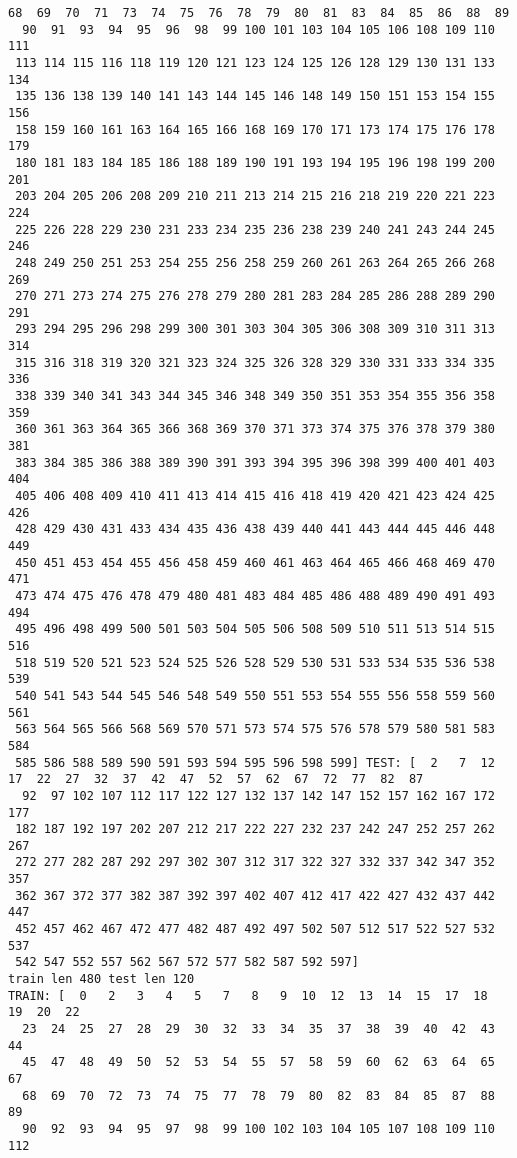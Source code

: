 \documentclass[11pt]{article}
\begin{document}
\begin{Verbatim}[commandchars=\\\{\}]
  68  69  70  71  73  74  75  76  78  79  80  81  83  84  85  86  88  89
  90  91  93  94  95  96  98  99 100 101 103 104 105 106 108 109 110 111
 113 114 115 116 118 119 120 121 123 124 125 126 128 129 130 131 133 134
 135 136 138 139 140 141 143 144 145 146 148 149 150 151 153 154 155 156
 158 159 160 161 163 164 165 166 168 169 170 171 173 174 175 176 178 179
 180 181 183 184 185 186 188 189 190 191 193 194 195 196 198 199 200 201
 203 204 205 206 208 209 210 211 213 214 215 216 218 219 220 221 223 224
 225 226 228 229 230 231 233 234 235 236 238 239 240 241 243 244 245 246
 248 249 250 251 253 254 255 256 258 259 260 261 263 264 265 266 268 269
 270 271 273 274 275 276 278 279 280 281 283 284 285 286 288 289 290 291
 293 294 295 296 298 299 300 301 303 304 305 306 308 309 310 311 313 314
 315 316 318 319 320 321 323 324 325 326 328 329 330 331 333 334 335 336
 338 339 340 341 343 344 345 346 348 349 350 351 353 354 355 356 358 359
 360 361 363 364 365 366 368 369 370 371 373 374 375 376 378 379 380 381
 383 384 385 386 388 389 390 391 393 394 395 396 398 399 400 401 403 404
 405 406 408 409 410 411 413 414 415 416 418 419 420 421 423 424 425 426
 428 429 430 431 433 434 435 436 438 439 440 441 443 444 445 446 448 449
 450 451 453 454 455 456 458 459 460 461 463 464 465 466 468 469 470 471
 473 474 475 476 478 479 480 481 483 484 485 486 488 489 490 491 493 494
 495 496 498 499 500 501 503 504 505 506 508 509 510 511 513 514 515 516
 518 519 520 521 523 524 525 526 528 529 530 531 533 534 535 536 538 539
 540 541 543 544 545 546 548 549 550 551 553 554 555 556 558 559 560 561
 563 564 565 566 568 569 570 571 573 574 575 576 578 579 580 581 583 584
 585 586 588 589 590 591 593 594 595 596 598 599] TEST: [  2   7  12  17  22  27  32  37  42  47  52  57  62  67  72  77  82  87
  92  97 102 107 112 117 122 127 132 137 142 147 152 157 162 167 172 177
 182 187 192 197 202 207 212 217 222 227 232 237 242 247 252 257 262 267
 272 277 282 287 292 297 302 307 312 317 322 327 332 337 342 347 352 357
 362 367 372 377 382 387 392 397 402 407 412 417 422 427 432 437 442 447
 452 457 462 467 472 477 482 487 492 497 502 507 512 517 522 527 532 537
 542 547 552 557 562 567 572 577 582 587 592 597]
train len 480 test len 120
TRAIN: [  0   2   3   4   5   7   8   9  10  12  13  14  15  17  18  19  20  22
  23  24  25  27  28  29  30  32  33  34  35  37  38  39  40  42  43  44
  45  47  48  49  50  52  53  54  55  57  58  59  60  62  63  64  65  67
  68  69  70  72  73  74  75  77  78  79  80  82  83  84  85  87  88  89
  90  92  93  94  95  97  98  99 100 102 103 104 105 107 108 109 110 112

\end{Verbatim}
\end{document}
